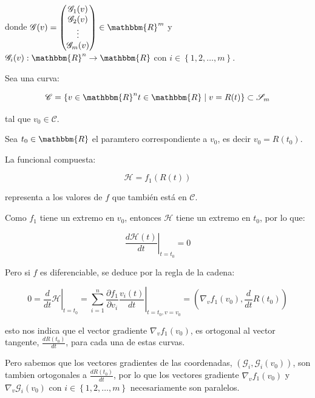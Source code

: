         donde $\mathscr{G}(v) = \begin{pmatrix} \mathscr{G}_1(v) \\ \mathscr{G}_2(v) \\ \vdots \\ \mathscr{G}_m(v) \end{pmatrix} \in \mathbbm{R}^m$
            y $\mathscr{G}_i(v):\mathbbm{R}^n \to \mathbbm{R}$
            con $i \in \left\{ 1,2,\dots,m \right\}$.

        Sea una curva:

        \begin{equation}
            \mathscr{C} = \left\{ v\in \mathbbm{R}^n t \in \mathbbm{R} \mid v = R(t) \right\} \subset \mathscr{S}_m
        \end{equation}

        tal que $v_0 \in \mathscr{C}$.

        Sea $t_0 \in \mathbbm{R}$ el paramtero correspondiente a $v_0$, es decir $v_0 = R(t_0)$.

        La funcional compuesta:

        \begin{equation}
            \mathscr{H} = f_1(R(t))
        \end{equation}

        representa a los valores de $f$  que también está en $\mathscr{C}$.

        Como $f_1$ tiene un extremo en $v_0$, entonces $\mathscr{H}$ tiene un extremo en $t_0$, por lo que:

        \begin{equation}
            \left. \frac{d \mathscr{H}(t)}{dt} \right|_{t=t_0} = 0
        \end{equation}

        Pero si $f$ es diferenciable, se deduce por la regla de la cadena:

        \begin{equation}
            0 = \left. \frac{d}{dt} \mathscr{H} \right|_{t=t_0} = \left. \sum_{i=1}^n \frac{\partial f_1}{\partial v_i} \frac{v_i(t)}{dt} \right|_{t=t_0, v=v_0} = \left( \nabla_v f_1(v_0), \frac{d}{dt} R(t_0) \right)
        \end{equation}

        esto nos indica que el vector gradiente $\nabla_v f_1(v_0)$, es ortogonal al vector tangente, $\frac{d R(t_0)}{dt}$, para cada una de estas curvas.

        Pero sabemos que los vectores gradientes de las coordenadas, $\left( \mathscr{G}_i, \mathscr{G}_i(v_0) \right)$, son tambien ortogonales a $\frac{d R(t_0)}{dt}$, por lo que los vectores gradiente $\nabla_v f_1(v_0)$ y $\nabla_v \mathscr{G}_i(v_0)$ con $i \in \left\{ 1, 2, \dots, m \right\}$ necesariamente son paralelos.

